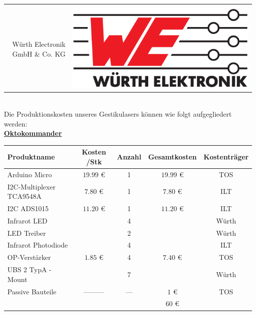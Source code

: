 \begin{tabularx}{\textwidth}{r c}
	\vspace{1.5cm} & \\
	Würth Electronik GmbH \& Co. KG & \noindent\parbox[c]{\hsize}{\includegraphics[scale=0.05]{../Logos/Wuerth.png}}
\end{tabularx} \\

Die Produktionskosten unseres Gestikulasers können wie folgt aufgegliedert werden:\\

\large{\underline{\textbf{Oktokommander}}} \\ 

\normalsize
\begin{tabularx}{\textwidth}{p{4.5cm} | c c c c}

Produktname 			& Kosten /Stk 		& Anzahl & Gesamtkosten    & Kostenträger \\ \hline
Arduino Micro 			& $19.99$ \euro{}   &   1    & $19.99$ \euro{} & TOS 	\\ [2mm]
I2C-Multiplexer TCA9548A& $7.80$ \euro{}    &   1    & $7.80$ \euro{}  & ILT    \\ [8mm]
I2C ADS1015				& $11.20$ \euro{}   &   1    & $11.20$ \euro{} & ILT    \\ [2mm]
Infrarot LED    		&					&   4    &				   & Würth  \\ [2mm]
LED Treiber     		&                   &   2    &                 & Würth  \\ [2mm]
Infrarot Photodiode 	&					&   4    &                 & ILT	\\ [8mm] 
OP-Verstärker    		& $1.85$ \euro{}    &	4    & $7.40$ \euro{}  & TOS    \\ [2mm]
UBS 2 TypA -Mount		&                   &   7    &                 & Würth  \\ [2mm]
Passive Bauteile    	&	---------       &   ---  &	$1$ \euro{}	   & TOS    \\ [2mm]\hline
						&					&		 & $  60  $	\euro{}&

\end{tabularx}\\

